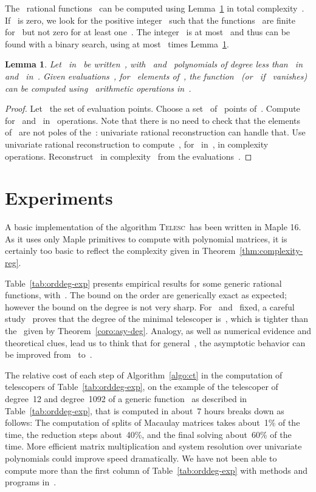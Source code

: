 \documentclass{sig-alternate}
\newtheorem{lem}[thm]{Lemma}
\newcommand{\tCreatTel}{\textsc{Telesc}}
\begin{document}
The~ rational functions~ can be computed using Lemma~\ref{prop:rat-reval} in total complexity~.
If~ is zero, we look for the positive integer~ such that the functions~ are finite for~ but not zero for at least one~.
The integer~ is at most~ and thus can be found with a binary search, using at most~ times Lemma~\ref{prop:rat-reval}.

\begin{lem}\label{prop:rat-reval}
  Let~ in~ be written~, with~ and~ polynomials of degree less than~ in~ and~ in~.
  Given evaluations~, for~ elements  of~, the function~ (or~ if~ vanishes) can be computed using~ arithmetic operations in~.
\end{lem}

\begin{proof}
  Let~ the set of evaluation points.
  Choose a set~ of~ points of~.
  Compute~ for~ and~ in~ operations.
  Note that there is no need to check that the elements of~ are not poles of the~: univariate rational reconstruction can handle that.
  Use univariate rational reconstruction to compute~, for~ in~, in complexity~ operations.
  Reconstruct~ in complexity~ from the evaluations~.
\end{proof}



\section{Experiments}



\noindent A basic implementation of the algorithm \tCreatTel\ has been written in Maple 16.
As it uses only Maple primitives to compute with polynomial matrices, it is certainly too basic to reflect the complexity given in Theorem~\ref{thm:complexity-reg}.

Table~\ref{tab:orddeg-exp} presents empirical results for some generic rational functions, with~. 
The bound on the order are generically exact as expected;
however the bound on the degree is not very sharp.
For~ and~ fixed, a careful study~\cite{BosCheChy10} proves that the degree of the minimal telescoper is~, which is tighter than the~ given by Theorem~\ref{coro:asy-deg}.
Analogy, as well as numerical evidence and theoretical clues, lead us to think that for general~, the asymptotic behavior can be improved from~ to~.

The relative cost of each step of Algorithm~\ref{algo:ct} in the computation of telescopers of Table~\ref{tab:orddeg-exp}, on the example of the telescoper of degree~12 and degree~1092 of a generic function~ as described in Table~\ref{tab:orddeg-exp}, that is computed in about~7 hours breaks down as follows:
The computation of splits of Macaulay matrices takes about~1\% of the time, the reduction steps about~40\%, and the final solving  about~60\% of the time.
More efficient matrix multiplication and system resolution over univariate polynomials could improve speed dramatically.
We have not been able to compute more than the first column of Table~\ref{tab:orddeg-exp} with methods and programs in~\cite{Kou10,CheKauSin12}.
\end{document}
